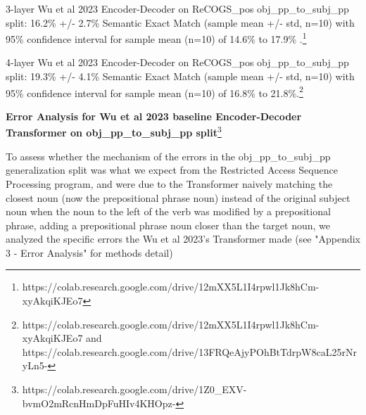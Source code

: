 \documentclass[11pt]{article}
\begin{document}
3-layer Wu et al 2023 Encoder-Decoder on ReCOGS\_pos obj\_pp\_to\_subj\_pp split: 16.2\% +/- 2.7\% Semantic Exact Match (sample mean +/- std, n=10) with 95\% confidence interval for sample mean (n=10) of 14.6\% to 17.9\% .\footnote{ https://colab.research.google.com/drive/12mXX5L1I4rpwl1Jk8hCm-xyAkqiKJEo7 }

4-layer Wu et al 2023 Encoder-Decoder on ReCOGS\_pos obj\_pp\_to\_subj\_pp split: 19.3\% +/- 4.1\% Semantic Exact Match (sample mean +/- std, n=10) with 95\% confidence interval for sample mean (n=10) of 16.8\% to 21.8\%.\footnote{ https://colab.research.google.com/drive/12mXX5L1I4rpwl1Jk8hCm-xyAkqiKJEo7 and https://colab.research.google.com/drive/13FRQeAjyPOhBtTdrpW8caL25rNryLn5- }

\textbf{Error Analysis for Wu et al 2023 baseline Encoder-Decoder Transformer on obj\_pp\_to\_subj\_pp split}\footnote{
https://colab.research.google.com/drive/1Z0\_EXV-bvmO2mRcnHmDpFuHIv4KHOpz-
}

To assess whether the mechanism of the errors in the obj\_pp\_to\_subj\_pp generalization split was what we expect from the Restricted Access Sequence Processing program, and were due to the Transformer naively matching the closest noun (now the prepositional phrase noun) instead of the original subject noun when the noun to the left of the verb was modified by a prepositional phrase, adding a prepositional phrase noun closer than the target noun, we analyzed the specific errors the Wu et al 2023's Transformer made (see "Appendix 3 - Error Analysis" for methods detail)

\end{document}
